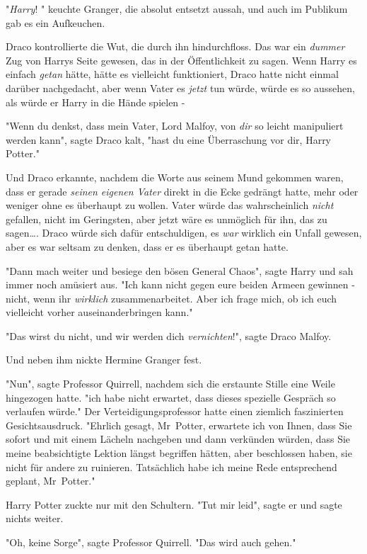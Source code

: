 {"\emph{Harry}! " keuchte Granger, die absolut entsetzt aussah, und auch im Publikum gab es ein Aufkeuchen.

Draco kontrollierte die Wut, die durch ihn hindurchfloss. Das war ein \emph{dummer} Zug von Harrys Seite gewesen, das in der Öffentlichkeit zu sagen. Wenn Harry es einfach \emph{getan} hätte, hätte es vielleicht funktioniert, Draco hatte nicht einmal darüber nachgedacht, aber wenn Vater es \emph{jetzt} tun würde, würde es so aussehen, als würde er Harry in die Hände spielen -

"Wenn du denkst, dass mein Vater, Lord Malfoy, von \emph{dir} so leicht manipuliert werden kann", sagte Draco kalt, "hast du eine Überraschung vor dir, Harry Potter."

Und Draco erkannte, nachdem die Worte aus seinem Mund gekommen waren, dass er gerade \emph{seinen eigenen Vater} direkt in die Ecke gedrängt hatte, mehr oder weniger ohne es überhaupt zu wollen. Vater würde das wahrscheinlich \emph{nicht} gefallen, nicht im Geringsten, aber jetzt wäre es unmöglich für ihn, das zu sagen…. Draco würde sich dafür entschuldigen, es \emph{war} wirklich ein Unfall gewesen, aber es war seltsam zu denken, dass er es überhaupt getan hatte.

"Dann mach weiter und besiege den bösen General Chaos", sagte Harry und sah immer noch amüsiert aus. "Ich kann nicht gegen eure beiden Armeen gewinnen - nicht, wenn ihr \emph{wirklich} zusammenarbeitet. Aber ich frage mich, ob ich euch vielleicht vorher auseinanderbringen kann."

"Das wirst du nicht, und wir werden dich \emph{vernichten}!", sagte Draco Malfoy.

Und neben ihm nickte Hermine Granger fest.

"Nun", sagte Professor Quirrell, nachdem sich die erstaunte Stille eine Weile hingezogen hatte. "ich habe nicht erwartet, dass dieses spezielle Gespräch so verlaufen würde." Der Verteidigungsprofessor hatte einen ziemlich faszinierten Gesichtsausdruck. "Ehrlich gesagt, Mr~Potter, erwartete ich von Ihnen, dass Sie sofort und mit einem Lächeln nachgeben und dann verkünden würden, dass Sie meine beabsichtigte Lektion längst begriffen hätten, aber beschlossen haben, sie nicht für andere zu ruinieren. Tatsächlich habe ich meine Rede entsprechend geplant, Mr~Potter."

Harry Potter zuckte nur mit den Schultern. "Tut mir leid", sagte er und sagte nichts weiter.

"Oh, keine Sorge", sagte Professor Quirrell. "Das wird auch gehen."

}
